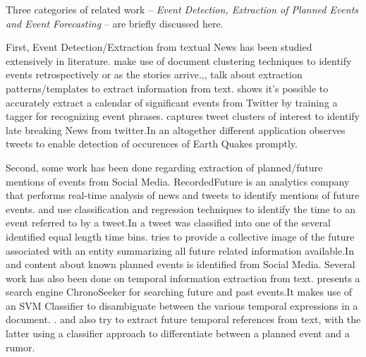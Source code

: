 Three categories of related work -- \emph{Event Detection, Extraction of Planned Events and  Event Forecasting} -- are briefly discussed here.

First, Event Detection/Extraction from textual News has been studied extensively in literature. \cite{Allan:2002:TDT} \cite{Yang:1998:SRO}\cite{Gabrilovich:2004:NPP} make use of document clustering techniques to identify events retrospectively or as the stories arrive.\cite{Chambers:2011:TIE},\cite{Banko07openinformation}, \cite{Riloff:2003:LEP} talk about extraction patterns/templates to extract information from text. \cite{Ritter:2012} shows it's possible to accurately extract a calendar of significant events from Twitter by training a tagger for recognizing event phrases.\cite{Sankaranarayanan:2009:TNT} captures tweet clusters of interest to identify late breaking News from twitter.In an altogether different application \cite{Sakaki:2010:EST} observes tweets to enable detection of occurences of Earth Quakes promptly.

Second, some work has been done regarding extraction of planned/future mentions of events from Social Media. RecordedFuture\cite{recordedFuture}  is an analytics company that performs real-time analysis of news and tweets to identify mentions of future events.\cite{tops2013predicting} and \cite{bosch2013estm} use classification and regression techniques to identify the time to an event referred to by a tweet.In \cite{tops2013predicting} a tweet was classified into one of the several identified equal length time bins. \cite{Jatowt:2011:ECE} tries to provide a collective image of the future associated with an entity summarizing all future related information available.In \cite{Becker:2012:ICP} and \cite{Becker_automaticidentification} content about known planned events is identified from Social Media. \iffalse \sathappanc{we do it on-line and focus mainly on planned protest and do it in multiple sources} \fi
Several work has also been done on temporal information extraction from text.
\cite{Kawai:2010:CSE} presents a search engine ChronoSeeker for searching future and past events.It makes use of an SVM Classifier to disambiguate between the various temporal expressions in a document. .\cite{baeza2005searching} and \cite{dias2011future} also try to extract future temporal references from text, with the latter using a classifier approach to differentiate between a planned event and a rumor.\iffalse \sathappanc{Also cite TEMPEX, TIMEN etc} \fi


